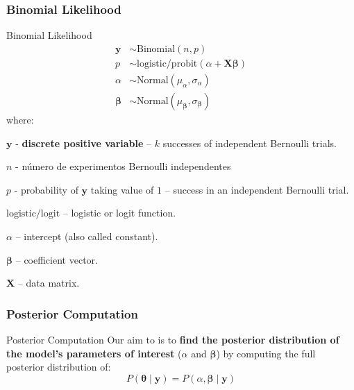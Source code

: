 \subsubsection{Binomial Likelihood}
\begin{frame}{Binomial Likelihood}
	\small
	$$
		\begin{aligned}
			\mathbf{y}     & \sim \text{Binomial}\left(n,  p\right)                                    \\
			p                  & \sim \text{logistic/probit}(\alpha +  \mathbf{X} \boldsymbol{\beta})      \\
			\alpha             & \sim \text{Normal}(\mu_\alpha, \sigma_\alpha)                             \\
			\boldsymbol{\beta} & \sim \text{Normal}(\mu_{\boldsymbol{\beta}}, \sigma_{\boldsymbol{\beta}})
		\end{aligned}
	$$
	where:
	\begin{vfilleditems}
		\item \small $\mathbf{y}$ - \textbf{discrete positive variable} -- $k$ successes of independent Bernoulli trials.
		\item \small $n$ - número de experimentos Bernoulli independentes
		\item \small $p$ - probability of $\mathbf{y}$ taking value of $1$ --
		success in an independent Bernoulli trial.
		\item \small $\text{logistic/logit}$ -- logistic or logit function.
		\item \small $\alpha$ -- intercept (also called constant).
		\item \small $\boldsymbol{\beta}$ -- coefficient vector.
		\item \small $\mathbf{X}$ -- data matrix.
	\end{vfilleditems}
\end{frame}

\subsubsection{Posterior Computation}
\begin{frame}{Posterior Computation}
	Our aim to is to \textbf{find the posterior distribution of the
		model's parameters of interest} ($\alpha$ and $\boldsymbol{\beta}$)
	by computing the full posterior distribution of:
	$$
		P(\boldsymbol{\theta} \mid \mathbf{y}) = P(\alpha, \boldsymbol{\beta} \mid \mathbf{y})
	$$
\end{frame}

